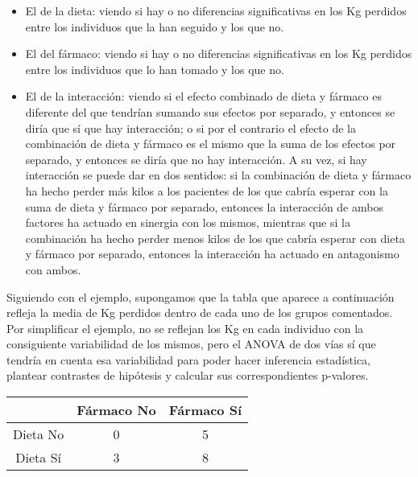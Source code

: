 \begin{itemize}

\item El de la dieta: viendo si hay o no diferencias significativas en los Kg perdidos entre los individuos que la han seguido y los que no.

\item El del fármaco: viendo si hay o no diferencias significativas en los Kg perdidos entre los individuos que lo han tomado y los que no.

\item El de la interacción: viendo si el efecto combinado de dieta y fármaco es diferente del que tendrían sumando sus efectos por separado, y entonces se diría que sí que hay interacción; o si por el contrario el efecto de la combinación de dieta y fármaco es el mismo que la suma de los efectos por separado, y entonces se diría que no hay interacción. A su vez, si hay interacción se puede dar en dos sentidos: si la combinación de dieta y fármaco ha hecho perder más kilos a los pacientes de los que cabría esperar con la suma de dieta y fármaco por separado, entonces la interacción de ambos factores ha actuado en sinergia con los mismos, mientras que si la combinación ha hecho perder menos kilos de los que cabría esperar con dieta y fármaco por separado, entonces la interacción ha actuado en antagonismo con ambos.

\end{itemize}

Siguiendo con el ejemplo, supongamos que la tabla que aparece a continuación refleja la media de Kg perdidos dentro de cada uno de los grupos comentados. Por simplificar el ejemplo, no se reflejan los Kg en cada individuo con la consiguiente variabilidad de los mismos, pero el ANOVA de dos vías sí que tendría en cuenta esa variabilidad para poder hacer inferencia estadística, plantear contrastes de hipótesis y calcular sus correspondientes p-valores.

\begin{center}
\begin{tabular}{|l|l|l|}
\cline{2-3}
\multicolumn{1}{c|}{} & \multicolumn{1}{c|}{Fármaco No} & \multicolumn{1}{c|}{Fármaco Sí} \\
\hline
\multicolumn{1}{|c|}{Dieta No} & \multicolumn{1}{c|}{0} & \multicolumn{1}{c|}{5} \\
\hline
\multicolumn{1}{|c|}{Dieta Sí} & \multicolumn{1}{c|}{3} & \multicolumn{1}{c|}{8} \\
\hline
\end{tabular}
\end{center}

